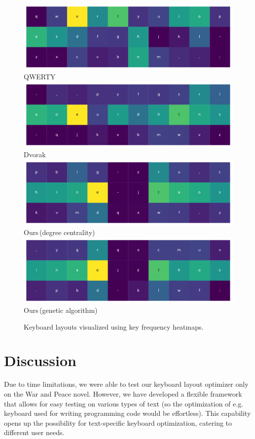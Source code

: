 \documentclass[9pt,twocolumn,twoside]{pnas-report}
\begin{document}
\lipsum[2-3]

\begin{figure}[t]\centering%
    \includegraphics[width=0.9\linewidth]{fig/qwerty}
    \small{QWERTY}
    \vskip8pt
    \includegraphics[width=0.9\linewidth]{fig/dvorak}
    \small{Dvorak}
    \vskip8pt
    \includegraphics[width=0.9\linewidth]{fig/centrality}
    \small{Ours\,(degree centrality)}
    \vskip8pt
    \includegraphics[width=0.9\linewidth]{fig/genetic}
    \small{Ours\,(genetic algorithm)}
    \caption{Keyboard layouts visualized using key frequency heatmaps.}
    \label{fig:layouts}
\end{figure}

\lipsum[4-6]

\section*{Discussion}

Due to time limitations, we were able to test our keyboard layout optimizer only on the War and Peace novel.
However, we have developed a flexible framework that allows for easy testing on various types of text (so the optimization of e.g. keyboard used for writing programming code would be effortless).
This capability opens up the possibility for text-specific keyboard optimization, catering to different user needs.
\end{document}
